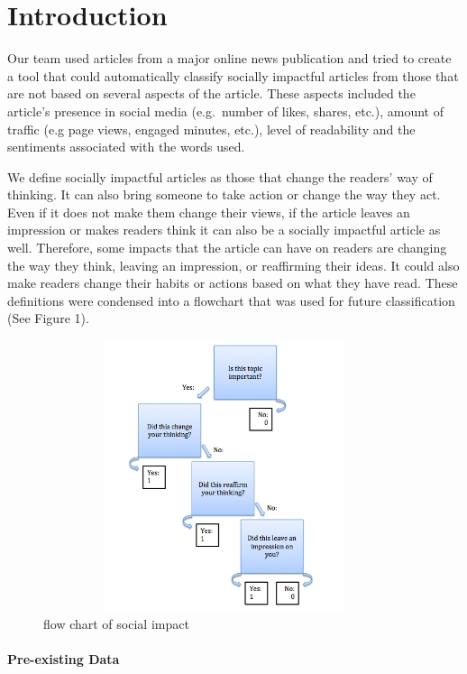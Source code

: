 \documentclass[10pt,letterpaper]{article}
\begin{document}
\linenumbers

\hypertarget{introduction}{%
\section{Introduction}\label{introduction}}

Our team used articles from a major online news publication and tried to
create a tool that could automatically classify socially impactful
articles from those that are not based on several aspects of the
article. These aspects included the article's presence in social media
(e.g.~number of likes, shares, etc.), amount of traffic (e.g page views,
engaged minutes, etc.), level of readability and the sentiments
associated with the words used.

We define socially impactful articles as those that change the readers'
way of thinking. It can also bring someone to take action or change the
way they act. Even if it does not make them change their views, if the
article leaves an impression or makes readers think it can also be a
socially impactful article as well. Therefore, some impacts that the
article can have on readers are changing the way they think, leaving an
impression, or reaffirming their ideas. It could also make readers
change their habits or actions based on what they have read. These
definitions were condensed into a flowchart that was used for future
classification (See Figure 1).

\begin{figure}
\includegraphics[width=400px,height=300px]{flow-chart} \caption{flow chart of social impact}\label{fig:unnamed-chunk-1}
\end{figure}

\hypertarget{pre-existing-data}{%
\paragraph{Pre-existing Data}\label{pre-existing-data}}
\end{document}
